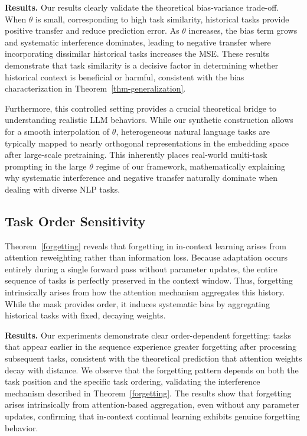 \documentclass{article}
\theoremstyle{plain}
\theoremstyle{definition}
\theoremstyle{remark}
\begin{document}
\noindent \textbf{Results.}
Our results clearly validate the theoretical bias-variance trade-off. When $\theta$ is small, corresponding to high task similarity, historical tasks provide positive transfer and reduce prediction error. As $\theta$ increases, the bias term grows and systematic interference dominates, leading to negative transfer where incorporating dissimilar historical tasks increases the MSE. These results demonstrate that task similarity is a decisive factor in determining whether historical context is beneficial or harmful, consistent with the bias characterization in Theorem~\ref{thm-generalization}.

Furthermore, this controlled setting provides a crucial theoretical bridge to understanding realistic LLM behaviors. While our synthetic construction allows for a smooth interpolation of $\theta$, heterogeneous natural language tasks are typically mapped to nearly orthogonal representations in the embedding space after large-scale pretraining. This inherently places real-world multi-task prompting in the large $\theta$ regime of our framework, mathematically explaining why systematic interference and negative transfer naturally dominate when dealing with diverse NLP tasks.

\subsection{Task Order Sensitivity}
Theorem~\ref{forgetting} reveals that forgetting in in-context learning arises from attention reweighting rather than information loss. Because adaptation occurs entirely during a single forward pass without parameter updates, the entire sequence of tasks is perfectly preserved in the context window. Thus, forgetting intrinsically arises from how the attention mechanism aggregates this history. While the mask provides order, it induces systematic bias by aggregating historical tasks with fixed, decaying weights.

\noindent \textbf{Results.}
Our experiments demonstrate clear order-dependent forgetting: tasks that appear earlier in the sequence experience greater forgetting after processing subsequent tasks, consistent with the theoretical prediction that attention weights decay with distance. We observe that the forgetting pattern depends on both the task position and the specific task ordering, validating the interference mechanism described in Theorem~\ref{forgetting}. The results show that forgetting arises intrinsically from attention-based aggregation, even without any parameter updates, confirming that in-context continual learning exhibits genuine forgetting behavior.
\end{document}
